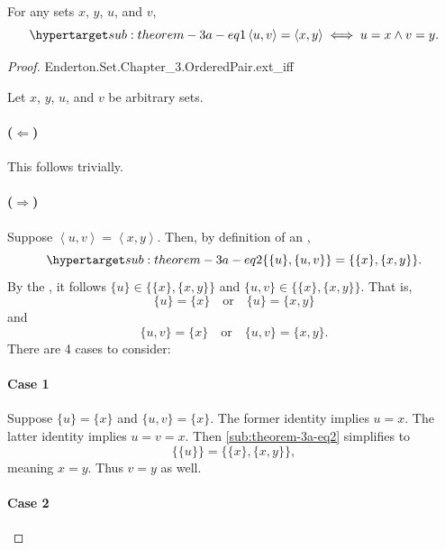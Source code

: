 \documentclass{report}
\newcommand{\pair}[1]{\left< #1 \right>}
\begin{document}
\begin{theorem}[3A]

  For any sets $x$, $y$, $u$, and $v$,
    \begin{equation}
      \hyperlabel{sub:theorem-3a-eq1}
      \pair{u, v} = \pair{x, y} \iff u = x \land v = y.
    \end{equation}

\end{theorem}

\begin{proof}

    {Enderton.Set.Chapter\_3.OrderedPair.ext\_iff}

  Let $x$, $y$, $u$, and $v$ be arbitrary sets.

  \paragraph{($\Leftarrow$)}%

    This follows trivially.

  \paragraph{($\Rightarrow$)}%

    Suppose $\pair{u, v} = \pair{x, y}$.
    Then, by definition of an ,
      \begin{equation}
        \hyperlabel{sub:theorem-3a-eq2}
        \{\{u\}, \{u, v\}\} = \{\{x\}, \{x, y\}\}.
      \end{equation}
    By the , it follows
      $\{u\} \in \{\{x\}, \{x, y\}\}$ and
      $\{u, v\} \in \{\{x\}, \{x, y\}\}$.
    That is,
      $$\{u\} = \{x\} \quad\text{or}\quad \{u\} = \{x, y\}$$
      and
      $$\{u, v\} = \{x\} \quad\text{or}\quad \{u, v\} = \{x, y\}.$$
    There are 4 cases to consider:

    \paragraph{Case 1}%

      Suppose $\{u\} = \{x\}$ and $\{u, v\} = \{x\}$.
      The former identity implies $u = x$.
      The latter identity implies $u = v = x$.
      Then \eqref{sub:theorem-3a-eq2} simplifies to
        $$\{\{u\}\} = \{\{x\}, \{x, y\}\},$$ meaning $x = y$.
      Thus $v = y$ as well.

    \paragraph{Case 2}%


\end{proof}
\end{document}
